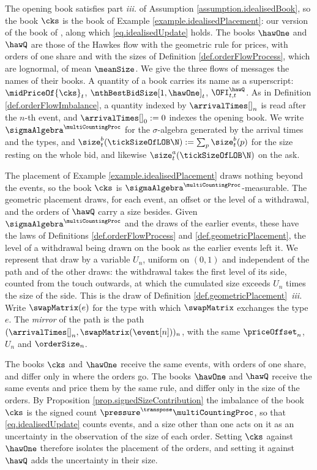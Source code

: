 The opening book satisfies part \emph{iii.} of Assumption \ref{assumption.idealisedBook},
so the book $\cks$ is the book of Example \ref{example.idealisedPlacement}:
our version of the book of \cite{CKS14pri},
along which \eqref{eq.idealisedUpdate} holds.
The books $\hawOne$ and $\hawQ$ are those of the Hawkes flow with the geometric rule for
prices,
with orders of one share and with the sizes of Definition \ref{def.orderFlowProcess},
which are lognormal, of mean $\meanSize$.
We give the three flows of messages the names of their books.
A quantity of a book carries its name as a superscript:
$\midPriceOf{\cks}_t$, $\nthBestBidSize[1,\hawOne]_t$, $\OFI^{\hawQ}_{t,t}$.
As in Definition \ref{def.orderFlowImbalance},
a quantity indexed by $\arrivalTimes[]_n$ is read after the $n$-th event,
and $\arrivalTimes[]_0 := 0$ indexes the opening book.
We write $\sigmaAlgebra^{\multiCountingProc}$ for the $\sigma$-algebra generated by the
arrival times and the types,
and $\size^{b}_t(\tickSizeOfLOB\N) := \sum_{p} \size^{b}_t(p)$
for the size resting on the whole bid,
and likewise $\size^{a}_t(\tickSizeOfLOB\N)$ on the ask.

The placement of Example \ref{example.idealisedPlacement} draws nothing beyond the events,
so the book $\cks$ is $\sigmaAlgebra^{\multiCountingProc}$-measurable.
The geometric placement draws, for each event, an offset or the level of a withdrawal,
and the orders of $\hawQ$ carry a size besides.
Given $\sigmaAlgebra^{\multiCountingProc}$ and the draws of the earlier events,
these have the laws of Definitions \ref{def.orderFlowProcess}
and \ref{def.geometricPlacement},
the level of a withdrawal being drawn on the book as the earlier events left it.
We represent that draw by a variable $U_n$,
uniform on $(0,1)$ and independent of the path and of the other draws:
the withdrawal takes the first level of its side,
counted from the touch outwards,
at which the cumulated size exceeds $U_n$ times the size of the side.
This is the draw of Definition \ref{def.geometricPlacement}~\emph{iii.}
Write $\swapMatrix(e)$ for the type with which $\swapMatrix$ exchanges the type $e$.
The \emph{mirror} of the path is the path $(\arrivalTimes[]_n, \swapMatrix(\event[n]))_n$,
with the same $\priceOffset_n$, $U_n$ and $\orderSize_n$.

The books $\cks$ and $\hawOne$ receive the same events, with orders of one share,
and differ only in where the orders go.
The books $\hawOne$ and $\hawQ$ receive the same events and price them by the same rule,
and differ only in the size of the orders.
By Proposition \ref{prop.signedSizeContribution}
the imbalance of the book $\cks$ is the signed count $\pressure^{\transpose}\multiCountingProc$,
so that \eqref{eq.idealisedUpdate} counts events,
and a size other than one acts on it as an uncertainty in the observation of the size of
each order.
Setting $\cks$ against $\hawOne$ therefore isolates the placement of the orders,
and setting it against $\hawQ$ adds the uncertainty in their size.

